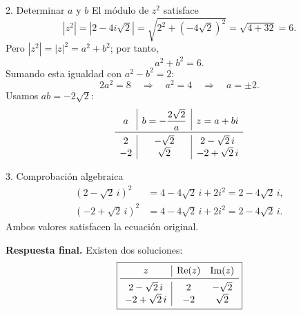 \documentclass[letterpaper,11pt]{article}
\newcommand{\R}{\operatorname{Re}}
\newcommand{\Ima}{\operatorname{Im}}
\begin{document}
\begin{desarrollo}{2. Determinar \(a\) y \(b\)}
El módulo de \(z^2\) satisface
\[
|z^2|=\left|2-4i\sqrt2\right|
=\sqrt{2^2+\left(-4\sqrt2\right)^2}
=\sqrt{4+32}=6.
\]
Pero \(|z^2|=|z|^2=a^2+b^2\); por tanto,
\[
a^2+b^2=6.
\]
Sumando esta igualdad con \(a^2-b^2=2\):
\[
2a^2=8
\quad\Longrightarrow\quad
a^2=4
\quad\Longrightarrow\quad
a=\pm2.
\]
Usamos \(ab=-2\sqrt2\):
\[
\begin{array}{c|c|c}
a & b=-\dfrac{2\sqrt2}{a} & z=a+bi\\ \midrule
2 & -\sqrt2 & 2-\sqrt2\,i\\
-2 & \sqrt2 & -2+\sqrt2\,i
\end{array}
\]
\end{desarrollo}

\begin{desarrollo}{3. Comprobación algebraica}
\[
\begin{aligned}
(2-\sqrt2\,i)^2
&=4-4\sqrt2\,i+2i^2
=2-4\sqrt2\,i,\\
(-2+\sqrt2\,i)^2
&=4-4\sqrt2\,i+2i^2
=2-4\sqrt2\,i.
\end{aligned}
\]
Ambos valores satisfacen la ecuación original.
\end{desarrollo}

\begin{respuesta}
\textbf{Respuesta final.} Existen dos soluciones:
\[
\boxed{
\begin{array}{c|cc}
z & \R(z) & \Ima(z)\\ \midrule
2-\sqrt2\,i & 2 & -\sqrt2\\
-2+\sqrt2\,i & -2 & \sqrt2
\end{array}}
\]
\end{respuesta}
\end{document}
